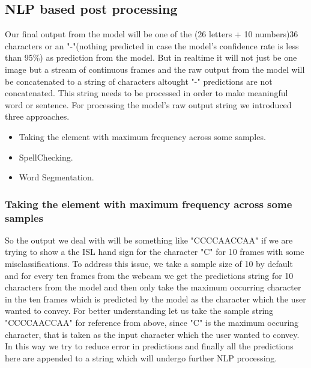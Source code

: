 \documentclass[12pt,a4paper]{report}
\begin{document}
\subsection{NLP based post processing}
Our final output from the model will be one of the (26 letters + 10 numbers)36 characters or an "-"(nothing predicted in case the model's confidence rate is less than 95\%) as prediction from the model. But in realtime it will not just be one image but a stream of continuous frames and the raw output from the model will be concatenated to a string of characters altought "-" predictions are not concatenated. This string needs to be processed in order to make meaningful word or sentence. For processing the model's raw output string we introduced three approaches.
\begin{itemize}
  \item Taking the element with maximum frequency across some samples.
  \item SpellChecking.
  \item Word Segmentation.
\end{itemize}

\subsubsection{Taking the element with maximum frequency across some samples}
So the output we deal with will be something like "CCCCAACCAA" if we are trying to show a the ISL hand sign for the character "C" for 10 frames with some misclassifications. To address this issue, we take a sample size of 10 by default and for every ten frames from the webcam we get the predictions string for 10 characters from the model and then only take the maximum occurring character in the ten frames which is predicted by the model as the character which the user wanted to convey. For better understanding let us take the sample string "CCCCAACCAA" for reference from above, since "C" is the maximum occuring character, that is taken as the input character which the user wanted to convey. In this way we try to reduce error in predictions and finally all the predictions here are appended to a string which will undergo further NLP processing.
\end{document}
